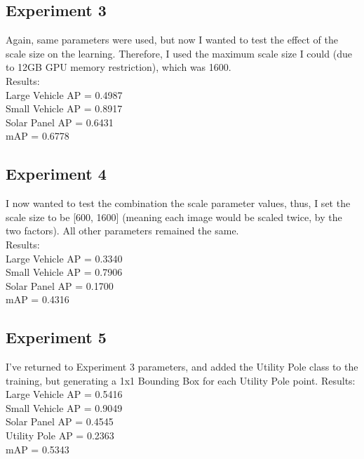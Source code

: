 \documentclass[]{article}
\begin{document}
\subsection{Experiment 3}
Again, same parameters were used, but now I wanted to test the effect of the scale size on the learning. Therefore, I used the maximum scale size I could (due to 12GB GPU memory restriction), which was 1600.\\
Results:\\
Large Vehicle AP = 0.4987\\
Small Vehicle AP = 0.8917\\
Solar Panel AP = 0.6431\\
mAP = 0.6778

\subsection{Experiment 4}
I now wanted to test the combination the scale parameter values, thus, I set the scale size to be [600, 1600] (meaning each image would be scaled twice, by the two factors). All other parameters remained the same.\\
Results:\\
Large Vehicle AP = 0.3340\\
Small Vehicle AP = 0.7906\\
Solar Panel AP = 0.1700\\
mAP = 0.4316

\subsection{Experiment 5}
I've returned to Experiment 3 parameters, and added the Utility Pole class to the training, but generating a 1x1 Bounding Box for each Utility Pole point.
Results:\\
Large Vehicle AP = 0.5416\\
Small Vehicle AP = 0.9049\\
Solar Panel AP = 0.4545\\
Utility Pole AP = 0.2363\\
mAP = 0.5343
\end{document}
